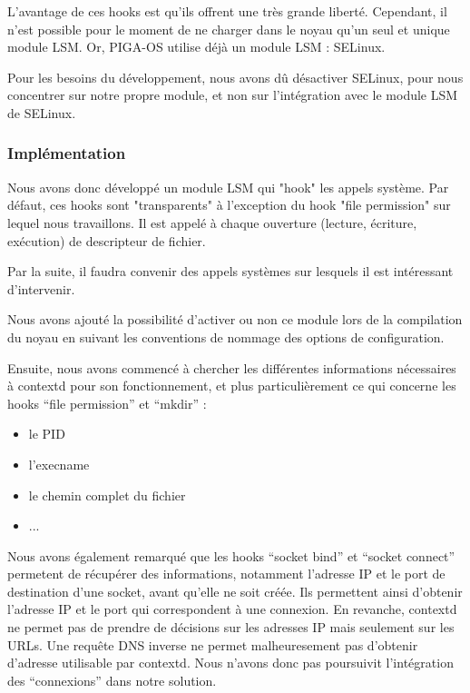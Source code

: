 L'avantage de ces hooks est qu'ils offrent une très grande liberté. Cependant, il n'est possible pour le moment de ne charger dans le noyau qu'un seul et unique module LSM. Or, PIGA-OS utilise déjà un module LSM : SELinux.

Pour les besoins du développement, nous avons dû désactiver SELinux, pour nous concentrer sur notre propre module, et non sur l'intégration avec le module LSM de SELinux.

\subsubsection{Implémentation}

Nous avons donc développé un module LSM qui "hook" les appels système. Par défaut, ces hooks sont "transparents" à l'exception du hook "file permission" sur lequel nous travaillons. Il est appelé à chaque ouverture (lecture, écriture, exécution) de descripteur de fichier.

Par la suite, il faudra convenir des appels systèmes sur lesquels il est intéressant d'intervenir.

Nous avons ajouté la possibilité d'activer ou non ce module lors de la compilation du noyau en suivant les conventions de nommage des options de configuration.

Ensuite, nous avons commencé à chercher les différentes informations nécessaires à contextd pour son fonctionnement, et plus particulièrement ce qui concerne les hooks ``file permission'' et ``mkdir'' :
	\begin{itemize}
		\item le PID
		\item l'execname
		\item le chemin complet du fichier
		\item ...
	\end{itemize}

Nous avons également remarqué que les hooks ``socket bind'' et ``socket connect'' permetent de récupérer des informations, notamment l'adresse IP et le port de destination d'une socket, avant qu'elle ne soit créée. Ils permettent ainsi d'obtenir l'adresse IP et le port qui correspondent à une connexion. En revanche, contextd ne permet pas de prendre de décisions sur les adresses IP mais seulement sur les URLs. Une requête DNS inverse ne permet malheuresement pas d'obtenir d'adresse utilisable par contextd. Nous n'avons donc pas poursuivit l'intégration des ``connexions'' dans notre solution.

